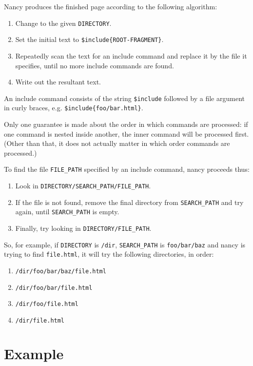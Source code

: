\documentclass[english]{scrartcl}
\begin{document}
Nancy produces the finished page according to the following algorithm:

\begin{enumerate}
\item Change to the given \verb|DIRECTORY|.
\item Set the initial text to \verb|$include{ROOT-FRAGMENT}|.
\item Repeatedly scan the text for an include command and replace it
  by the file it specifies, until no more include commands are
  found.\item Write out the resultant text.
\end{enumerate}

An include command consists of the string \verb|$include| followed by
a file argument in curly braces, e.g. \verb|$include{foo/bar.html}|.

Only one guarantee is made about the order in which commands are
processed: if one command is nested inside another, the inner command
will be processed first. (Other than that, it does not actually matter
in which order commands are processed.)

To find the file \verb|FILE_PATH| specified by an include command,
nancy proceeds thus:

\begin{enumerate}
\item Look in \verb|DIRECTORY/SEARCH_PATH/FILE_PATH|.
\item If the file is not found, remove the final directory from
  \verb|SEARCH_PATH| and try again, until \verb|SEARCH_PATH| is
  empty.
\item Finally, try looking in \verb|DIRECTORY/FILE_PATH|.
\end{enumerate}

So, for example, if \verb|DIRECTORY| is \verb|/dir|,
\verb|SEARCH_PATH| is \verb|foo/bar/baz| and nancy is trying to
find \verb|file.html|, it will try the following directories, in
order:

\begin{enumerate}
\item \verb|/dir/foo/bar/baz/file.html|
\item \verb|/dir/foo/bar/file.html|
\item \verb|/dir/foo/file.html|
\item \verb|/dir/file.html|
\end{enumerate}

\section{Example}
\end{document}
